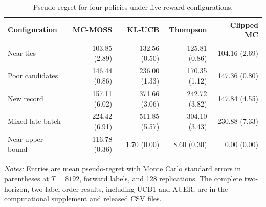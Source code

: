 \begin{table}[t]
\centering
\caption{Pseudo-regret for four policies under five reward configurations.}
\label{tab:mechanisms-baselines}
\normalsize
\setlength{\tabcolsep}{3pt}
\begin{tabular*}{\linewidth}{@{\extracolsep{\fill}}lrrrr@{}}
\toprule
Configuration & MC-MOSS & KL-UCB & Thompson & Clipped MC \\
\midrule
Near ties & 103.85 (2.89) & 132.56 (0.50) & 125.81 (0.86) & 104.16 (2.69) \\
Poor candidates & 146.44 (0.86) & 236.00 (1.33) & 170.35 (1.12) & 147.36 (0.80) \\
New record & 157.11 (6.02) & 371.66 (3.06) & 242.72 (3.82) & 147.84 (4.55) \\
Mixed late batch & 224.42 (6.91) & 511.85 (5.57) & 304.10 (3.43) & 230.88 (7.33) \\
Near upper bound & 116.78 (0.36) & 1.70 (0.00) & 8.60 (0.30) & 0.00 (0.00) \\
\bottomrule
\end{tabular*}
\par\medskip\noindent\begin{minipage}{\linewidth}\normalsize{}
\textit{Notes:} Entries are mean pseudo-regret with Monte Carlo standard errors in parentheses at $T=8192$, forward labels, and 128 replications. The complete two-horizon, two-label-order results, including UCB1 and AUER, are in the computational supplement and released CSV files.
\end{minipage}
\end{table}
